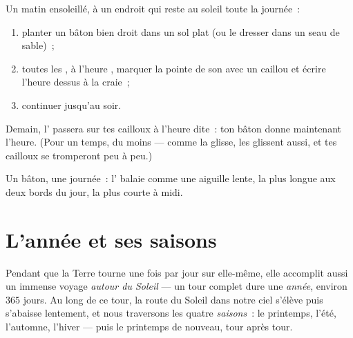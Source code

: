 \begin{method}\label{met:g3:sun-days-seasons:build}
Un matin ensoleillé, à un endroit qui reste au soleil toute la
journée~:
\begin{enumerate}
  \item planter un bâton bien droit dans un sol plat (ou le dresser
        dans un seau de sable)~;
  \item toutes les , à l'heure , marquer la pointe de son
         avec un caillou et écrire l'heure dessus à la craie~;
  \item continuer jusqu'au soir.
\end{enumerate}
Demain, l' passera sur tes cailloux à l'heure dite~: ton bâton
donne maintenant l'heure. (Pour un temps, du moins --- comme la
 glisse, les  glissent aussi, et tes cailloux se
tromperont peu à peu.)
\end{method}

\begin{omfigure}

{\small Un bâton, une journée~: l' balaie comme une aiguille
lente, la plus longue aux deux bords du jour, la plus courte à midi.}
\end{omfigure}

\section{L'année et ses saisons}

\begin{definition}\label{def:g3:sun-days-seasons:year}
Pendant que la Terre tourne une fois par jour sur elle-même, elle
accomplit aussi un immense voyage \emph{autour du Soleil} --- un tour
complet dure une \emph{année}, environ $365$ jours. Au
long de ce tour, la route du Soleil dans notre ciel s'élève puis
s'abaisse lentement, et nous traversons les quatre
\emph{saisons}~: le printemps, l'été, l'automne,
l'hiver --- puis le printemps de nouveau, tour après tour.
\end{definition}

